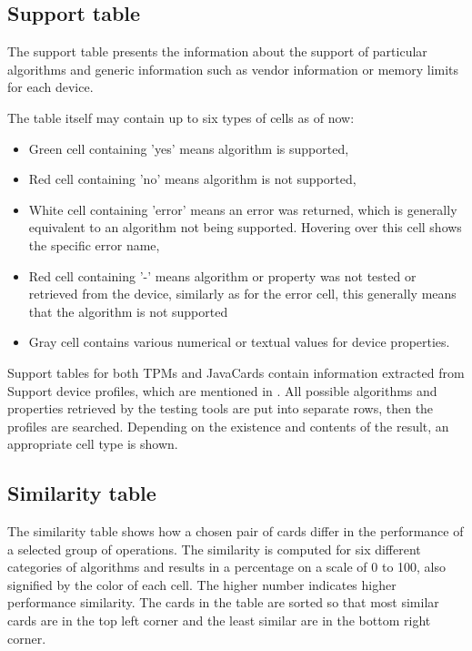 \subsection{Support table}
The support table presents the information about the support of particular algorithms and generic information such as vendor information or memory limits for each device.

The table itself may contain up to six types of cells as of now:
\begin{itemize}
    \item Green cell containing 'yes' means algorithm is supported,
    \item Red cell containing 'no' means algorithm is not supported,
    \item White cell containing 'error' means an error was returned, which is generally equivalent to an algorithm not being supported. Hovering over this cell shows the specific error name,
    \item Red cell containing '-' means algorithm or property was not tested or retrieved from the device, similarly as for the error cell, this generally means that the algorithm is not supported
    \item Gray cell contains various numerical or textual values for device properties.
\end{itemize}

Support tables for both TPMs and JavaCards contain information extracted from Support device profiles, which are mentioned in . All possible algorithms and properties retrieved by the testing tools are put into separate rows, then the profiles are searched. Depending on the existence and contents of the result, an appropriate cell type is shown. 


\subsection{Similarity table}
The similarity table shows how a chosen pair of cards differ in the performance of a selected group of operations. The similarity is computed for six different categories of algorithms and results in a percentage on a scale of 0 to 100, also signified by the color of each cell. The higher number indicates higher performance similarity. The cards in the table are sorted so that most similar cards are in the top left corner and the least similar are in the bottom right corner.

